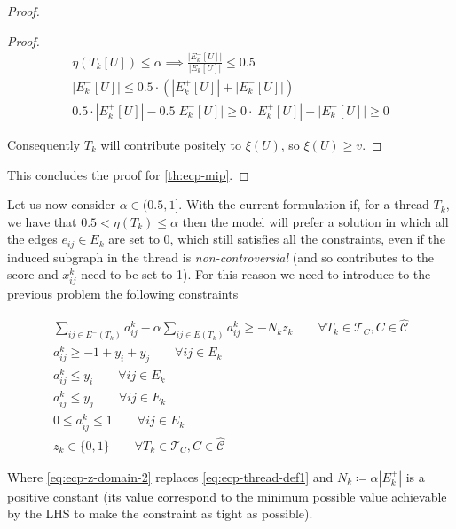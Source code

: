 \begin{proof}
\begin{proof}
		\begin{gather*}
			\eta(T_k[U]) \leq \alpha \implies \frac{|E^{-}_{k}[U]|}{|E_{k}[U]|}
			\leq 0.5 \\
			|E^{-}_{k}[U]| \leq 0.5 \cdot (|E^{+}_{k}[U]| + |E^{-}_{k}[U]|) \\
			0.5 \cdot |E^{+}_{k}[U]| - 0.5 |E^{-}_{k}[U]| \geq 0
			\cdot |E^{+}_{k}[U]| - |E^{-}_{k}[U]| \geq 0
		\end{gather*}

		Consequently $T_k$ will contribute positely to $\xi(U)$, so $\xi(U)
			\geq v$.
	\end{proof}

	This concludes the proof for \autoref{th:ecp-mip}.
\end{proof}

\clearpage

Let us now consider $\alpha \in (0.5, 1]$. With the current formulation if, for
a thread $T_k$, we have that $0.5 < \eta(T_k) \leq \alpha $ then the model will
prefer a solution in which all the edges $e_{ij} \in E_k$ are set to $0$, which
still satisfies all the constraints, even if the induced subgraph in the thread
is \emph{non-controversial} (and so contributes to the score and $x_{ij}^{k}  $
need to be set to 1). For this reason we need to introduce to the previous
problem the following constraints

\begin{gather}
	\label{eq:ecp-a-alpha-constraint}
	\sum^{}_{ij \in E^{-} (T_k)} a_{ij}^{k}  - \alpha \sum^{}_{ij \in E(T_k)}
	a_{ij} ^{k} \geq - N_{k} z_{k}  \quad\quad \forall T_{k} \in \mathcal{T} _{C}, C \in
	\hat{\mathcal{C}} \\
	\label{eq:ecp-a-ij-g-i-j}
	a_{ij}^{k} \geq -1 + y_i + y_j \quad\quad \forall ij \in E_k \\
	\label{eq:ecp-a-ij-l-i}
	a_{ij}^{k} \leq y_i\quad\quad \forall ij \in E_k \\
	\label{eq:ecp-a-ij-l-j}
	a_{ij}^{k} \leq y_j \quad\quad \forall ij \in E_k \\
	\label{eq:ecp-a-domain-2}
	0 \leq a_{ij}^{k} \leq 1 \quad\quad \forall ij \in E_k \\
	\label{eq:ecp-z-domain-2}
	z _{k} \in  \{0, 1\} \quad\quad \forall T_{k} \in \mathcal{T} _{C}, C \in
	\hat{\mathcal{C}}
\end{gather}

Where \autoref{eq:ecp-z-domain-2} replaces \autoref{eq:ecp-thread-def1} and
$N_k \coloneqq \alpha |E^{+}_k| $ is a positive constant (its value correspond
to the minimum possible value achievable by the LHS to make the constraint as
tight as possible).

